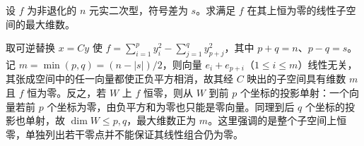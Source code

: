 \begin{example}
设 $f$ 为非退化的 $n$ 元实二次型，符号差为 $s$。求满足 $f$ 在其上恒为零的线性子空间的最大维数。
\end{example}
\begin{solve}
取可逆替换 $x=Cy$ 使 $f=\sum_{i=1}^p y_i^2-\sum_{j=1}^q y_{p+j}^2$，其中 $p+q=n$、$p-q=s$。记 $m=\min(p,q)=(n-|s|)/2$，则向量 $e_i+e_{p+i}$（$1\le i\le m$）线性无关，其张成空间中的任一向量都使正负平方相消，故其经 $C$ 映出的子空间具有维数 $m$ 且 $f$ 恒为零。反之，若 $W$ 上 $f$ 恒零，则从 $W$ 到前 $p$ 个坐标的投影单射：一个向量若前 $p$ 个坐标为零，由负平方和为零也只能是零向量。同理到后 $q$ 个坐标的投影也单射，故 $\dim W\le p,q$，最大维数正为 $m$。这里强调的是整个子空间上恒零，单独列出若干零点并不能保证其线性组合仍为零。
\end{solve}






